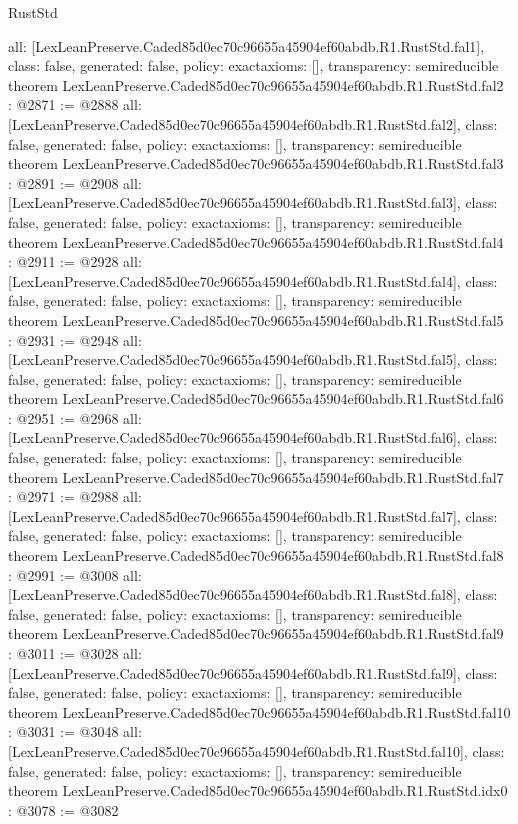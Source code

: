 \begin{lexlean}{RustStd}
\begin{coremodule}
{  all: [LexLeanPreserve.Caded85d0ec70c96655a45904ef60abdb.R1.RustStd.fal1],
  class: false,
  generated: false,
  policy: exact{axioms: []},
  transparency: semireducible
}
theorem LexLeanPreserve.Caded85d0ec70c96655a45904ef60abdb.R1.RustStd.fal2 : @2871 := @2888 {
  all: [LexLeanPreserve.Caded85d0ec70c96655a45904ef60abdb.R1.RustStd.fal2],
  class: false,
  generated: false,
  policy: exact{axioms: []},
  transparency: semireducible
}
theorem LexLeanPreserve.Caded85d0ec70c96655a45904ef60abdb.R1.RustStd.fal3 : @2891 := @2908 {
  all: [LexLeanPreserve.Caded85d0ec70c96655a45904ef60abdb.R1.RustStd.fal3],
  class: false,
  generated: false,
  policy: exact{axioms: []},
  transparency: semireducible
}
theorem LexLeanPreserve.Caded85d0ec70c96655a45904ef60abdb.R1.RustStd.fal4 : @2911 := @2928 {
  all: [LexLeanPreserve.Caded85d0ec70c96655a45904ef60abdb.R1.RustStd.fal4],
  class: false,
  generated: false,
  policy: exact{axioms: []},
  transparency: semireducible
}
theorem LexLeanPreserve.Caded85d0ec70c96655a45904ef60abdb.R1.RustStd.fal5 : @2931 := @2948 {
  all: [LexLeanPreserve.Caded85d0ec70c96655a45904ef60abdb.R1.RustStd.fal5],
  class: false,
  generated: false,
  policy: exact{axioms: []},
  transparency: semireducible
}
theorem LexLeanPreserve.Caded85d0ec70c96655a45904ef60abdb.R1.RustStd.fal6 : @2951 := @2968 {
  all: [LexLeanPreserve.Caded85d0ec70c96655a45904ef60abdb.R1.RustStd.fal6],
  class: false,
  generated: false,
  policy: exact{axioms: []},
  transparency: semireducible
}
theorem LexLeanPreserve.Caded85d0ec70c96655a45904ef60abdb.R1.RustStd.fal7 : @2971 := @2988 {
  all: [LexLeanPreserve.Caded85d0ec70c96655a45904ef60abdb.R1.RustStd.fal7],
  class: false,
  generated: false,
  policy: exact{axioms: []},
  transparency: semireducible
}
theorem LexLeanPreserve.Caded85d0ec70c96655a45904ef60abdb.R1.RustStd.fal8 : @2991 := @3008 {
  all: [LexLeanPreserve.Caded85d0ec70c96655a45904ef60abdb.R1.RustStd.fal8],
  class: false,
  generated: false,
  policy: exact{axioms: []},
  transparency: semireducible
}
theorem LexLeanPreserve.Caded85d0ec70c96655a45904ef60abdb.R1.RustStd.fal9 : @3011 := @3028 {
  all: [LexLeanPreserve.Caded85d0ec70c96655a45904ef60abdb.R1.RustStd.fal9],
  class: false,
  generated: false,
  policy: exact{axioms: []},
  transparency: semireducible
}
theorem LexLeanPreserve.Caded85d0ec70c96655a45904ef60abdb.R1.RustStd.fal10 : @3031 := @3048 {
  all: [LexLeanPreserve.Caded85d0ec70c96655a45904ef60abdb.R1.RustStd.fal10],
  class: false,
  generated: false,
  policy: exact{axioms: []},
  transparency: semireducible
}
theorem LexLeanPreserve.Caded85d0ec70c96655a45904ef60abdb.R1.RustStd.idx0 : @3078 := @3082 {
}
\end{coremodule}
\end{lexlean}
